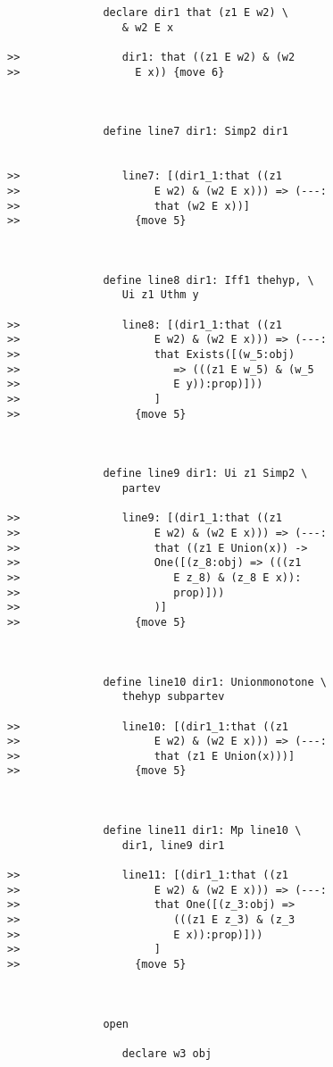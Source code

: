 \documentclass[12pt]{article}
\begin{document}
\begin{verbatim}
               declare dir1 that (z1 E w2) \
                  & w2 E x

>>                dir1: that ((z1 E w2) & (w2
>>                  E x)) {move 6}



               define line7 dir1: Simp2 dir1


>>                line7: [(dir1_1:that ((z1
>>                     E w2) & (w2 E x))) => (---:
>>                     that (w2 E x))]
>>                  {move 5}



               define line8 dir1: Iff1 thehyp, \
                  Ui z1 Uthm y

>>                line8: [(dir1_1:that ((z1
>>                     E w2) & (w2 E x))) => (---:
>>                     that Exists([(w_5:obj)
>>                        => (((z1 E w_5) & (w_5
>>                        E y)):prop)]))
>>                     ]
>>                  {move 5}



               define line9 dir1: Ui z1 Simp2 \
                  partev

>>                line9: [(dir1_1:that ((z1
>>                     E w2) & (w2 E x))) => (---:
>>                     that ((z1 E Union(x)) ->
>>                     One([(z_8:obj) => (((z1
>>                        E z_8) & (z_8 E x)):
>>                        prop)]))
>>                     )]
>>                  {move 5}



               define line10 dir1: Unionmonotone \
                  thehyp subpartev

>>                line10: [(dir1_1:that ((z1
>>                     E w2) & (w2 E x))) => (---:
>>                     that (z1 E Union(x)))]
>>                  {move 5}



               define line11 dir1: Mp line10 \
                  dir1, line9 dir1

>>                line11: [(dir1_1:that ((z1
>>                     E w2) & (w2 E x))) => (---:
>>                     that One([(z_3:obj) =>
>>                        (((z1 E z_3) & (z_3
>>                        E x)):prop)]))
>>                     ]
>>                  {move 5}



               open

                  declare w3 obj


\end{verbatim}
\end{document}
